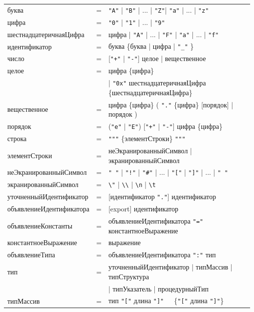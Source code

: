 \documentclass[a4paper,12pt]{article}
\newcommand{\lit}[1]{\texttt{"#1"}}
\begin{document}
    \setlength\LTleft{-1cm}
    \begin{center}
        \begin{longtable}{l c l}
            буква & = & \lit{A} | \lit{B} | ... | \lit{Z}| \lit{a} | ... | \lit{z} \\
            цифра & = & \lit{0} | \lit{1} | ... | \lit{9} \\
            шестнадцатеричнаяЦифра & = & цифра | \lit{A} | ... | \lit{F} | \lit{a} | ... | \lit{f}\\
            идентификатор & = & буква \{буква | цифра | \lit{\_} \} \\
            число & = & [\lit{+} | \lit{-}] целое | вещественное \\
            целое & = & цифра \{цифра\} \\
            & & | \lit{0x} шестнадцатеричнаяЦифра \{шестнадцатеричнаяЦифра\}\\
            вещественное & = & цифра \{цифра\} ( \lit{.} \{цифра\} [порядок] | порядок ) \\
            порядок & = & (\lit{e} | \lit{E}) [\lit{+} | \lit{-}] цифра \{цифра\} \\
            строка & = & \lit{"} \{элементСтроки\} \lit{"} \\
            элементСтроки & = & неЭкранированныйСимвол | экранированныйСимвол \\
            неЭкранированныйСимвол & = & \lit{ } | \lit{!} | \lit{\#} | ... | \lit{[} | \lit{]} | ... | \lit{\string~} \\
            экранированныйСимвол & = & \texttt{\textbackslash "} | \texttt{\textbackslash \textbackslash} | \texttt{\textbackslash n} | \texttt{\textbackslash t} \\
            уточненныйИдентификатор & = & [идентификатор \lit{.}] идентификатор \\
            объявлениеИдентификатора & = & [export] идентификатор \\
            объявлениеКонстанты & = & объявлениеИдентификатора \lit{=} константноеВыражение \\
            константноеВыражение & = & выражение \\
            объявлениеТипа & = & объявлениеИдентификатора \lit{:} тип \\
            тип & = & уточненныйИдентификатор | типМассив | типСтруктура\\
            & & | типУказатель | процедурныйТип \\
            типМассив & = & тип \lit{[} длина \lit{]}\ \ \  \{\lit{[} длина \lit{]}\} \\

\end{longtable}
\end{center}
\end{document}
